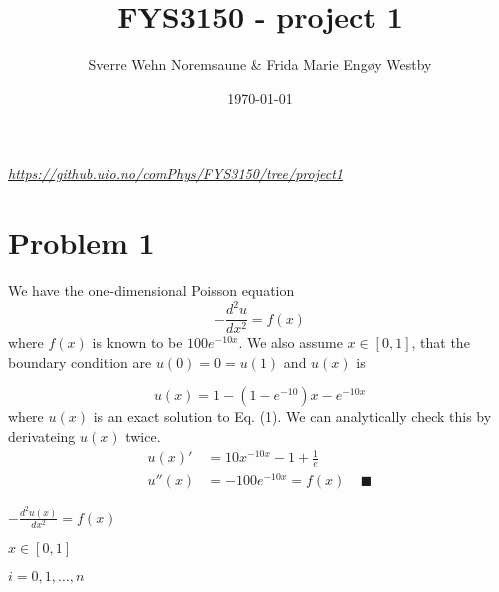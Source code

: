 \documentclass[english,notitlepage]{revtex4-1}  %
\begin{document}
\title{FYS3150 - project 1}      %
\author{Sverre Wehn Noremsaune \& Frida Marie Engøy Westby}          %
\date{\today}                             %
\noaffiliation                            %


\maketitle 
    
\textit{\href{<url>}{https://github.uio.no/comPhys/FYS3150/tree/project1}}
    
\section*{Problem 1}

We have the one-dimensional Poisson equation
\begin{equation}\label{eq:one-dimensional Poisson}
    - \frac{d^2u}{dx^2} = f(x)
\end{equation}
where $f(x)$ is known to be $100e^{-10x}$. We also assume $x \in [0,1]$, that the boundary condition are $u(0) = 0 = u(1)$ and $u(x)$ is

\begin{equation}\label{eq:exact solution one-dimensional Poisson}
    u(x) = 1 - (1 - e^{-10})x-e^{-10x}
\end{equation}
where $u(x)$ is an exact solution to Eq. (1). We can analytically check this by derivateing $u(x)$ twice.
\begin{equation*}
    \begin{split}
        u(x)' &= 10x^{-10x} - 1 + \frac{1}{e} \\
        u''(x) &= -100e^{-10x} = f(x) \;\;\;\; \blacksquare
    \end{split}
\end{equation*}



$-\frac{d^2u(x)}{dx^2} = f(x)$

$ x \in \left[0, 1 \right] $

$i = 0,1,\dots,n$
\end{document}
